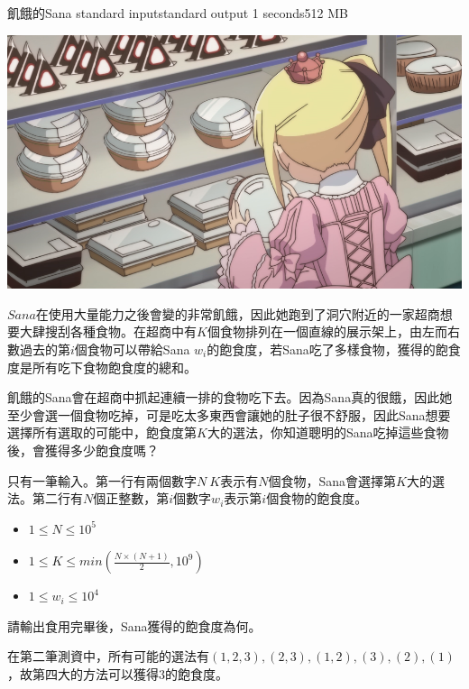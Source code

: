 \gdef\thisproblemauthor{}
\gdef\thisproblemdeveloper{}
\gdef\thisproblemorigin{}
\begin{problem}{飢餓的Sana}
{standard input}{standard output}
{1 seconds}{512 MB}{}

\centerline{\includegraphics[scale=0.5]{./pics/B.png}}

$Sana$在使用大量能力之後會變的非常飢餓，因此她跑到了洞穴附近的一家超商想要大肆搜刮各種食物。在超商中有$K$個食物排列在一個直線的展示架上，由左而右數過去的第$i$個食物可以帶給Sana $w_i$的飽食度，若Sana吃了多樣食物，獲得的飽食度是所有吃下食物飽食度的總和。

飢餓的Sana會在超商中抓起連續一排的食物吃下去。因為Sana真的很餓，因此她至少會選一個食物吃掉，可是吃太多東西會讓她的肚子很不舒服，因此Sana想要選擇所有選取的可能中，飽食度第$K$大的選法，你知道聰明的Sana吃掉這些食物後，會獲得多少飽食度嗎？

\InputFile

只有一筆輸入。第一行有兩個數字$N~K$表示有$N$個食物，Sana會選擇第$K$大的選法。第二行有$N$個正整數，第$i$個數字$w_i$表示第$i$個食物的飽食度。

\begin{iofmt}
\begin{itemize}
	\item $1 \leq N \leq 10^5$
	\item $1 \leq K \leq min(\frac{N\times(N+1)}{2},10^9)$
	\item $1\leq w_i \leq 10^4$
\end{itemize}
\end{iofmt}

\OutputFile

請輸出食用完畢後，Sana獲得的飽食度為何。

\Examples

\begin{example}
%
\end{example}

\Examples
\begin{example}
%
\end{example}


\Explanations

在第二筆測資中，所有可能的選法有$(1,2,3),(2,3),(1,2),(3),(2),(1)$，故第四大的方法可以獲得$3$的飽食度。

\end{problem}
